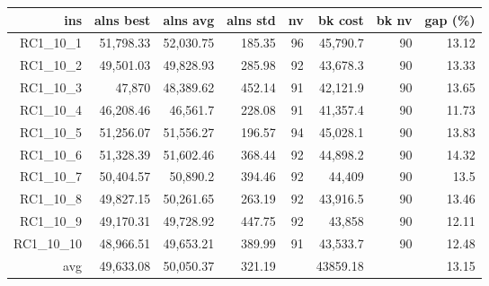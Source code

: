   \begin{table}[caption={Kết quả đo với tập HG\_RC\_1\_10 1000 yêu cầu}, label=exp:HGRC110]
    \small
    \centering
    \begin{tabular}{rrrrrrrr}
    \hline
    ins & alns best & alns avg & alns std & nv & bk cost & bk nv & gap (\%) \\ \hline
    RC1\_10\_1 & 51,798.33 & 52,030.75 & 185.35 & 96 & 45,790.7 & 90 & 13.12 \\ \hline
    RC1\_10\_2 & 49,501.03 & 49,828.93 & 285.98 & 92 & 43,678.3 & 90 & 13.33 \\ \hline
    RC1\_10\_3 & 47,870 & 48,389.62 & 452.14 & 91 & 42,121.9 & 90 & 13.65 \\ \hline
    RC1\_10\_4 & 46,208.46 & 46,561.7 & 228.08 & 91 & 41,357.4 & 90 & 11.73 \\ \hline
    RC1\_10\_5 & 51,256.07 & 51,556.27 & 196.57 & 94 & 45,028.1 & 90 & 13.83 \\ \hline
    RC1\_10\_6 & 51,328.39 & 51,602.46 & 368.44 & 92 & 44,898.2 & 90 & 14.32 \\ \hline
    RC1\_10\_7 & 50,404.57 & 50,890.2 & 394.46 & 92 & 44,409 & 90 & 13.5 \\ \hline
    RC1\_10\_8 & 49,827.15 & 50,261.65 & 263.19 & 92 & 43,916.5 & 90 & 13.46 \\ \hline
    RC1\_10\_9 & 49,170.31 & 49,728.92 & 447.75 & 92 & 43,858 & 90 & 12.11 \\ \hline
    RC1\_10\_10 & 48,966.51 & 49,653.21 & 389.99 & 91 & 43,533.7 & 90 & 12.48 \\ \hline
    avg & 49,633.08 & 50,050.37 & 321.19 & & 43859.18 & & 13.15 \\ \hline
    \end{tabular}
  \end{table}
